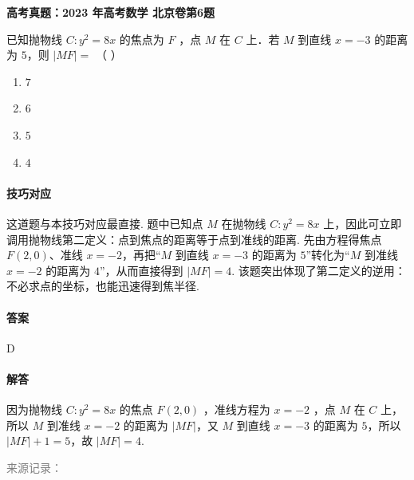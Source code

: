 \documentclass[UTF8,a4paper,11pt]{ctexart}
\newenvironment{gaokao}[1]{\par\medskip\noindent\textbf{高考真题：#1}\par\smallskip}{\par\medskip}
\begin{document}
\begin{gaokao}{2023 年高考数学 北京卷第6题}

已知抛物线 $C: y^2 = 8x$ 的焦点为 $F$ ，点 $M$ 在 $C$ 上．若 $M$ 到直线 $x = -3$ 的距离为 $5$，则 $|MF| =$ （ ）

\begin{enumerate}[label=\Alph*. ,itemsep=2pt]

\item $7$

\item $6$

\item $5$

\item $4$

\end{enumerate}

\begin{center}


\end{center}

\paragraph{技巧对应}

这道题与本技巧对应最直接. 题中已知点 $M$ 在抛物线 $C:y^2=8x$ 上，因此可立即调用抛物线第二定义：点到焦点的距离等于点到准线的距离. 先由方程得焦点 $F(2,0)$、准线 $x=-2$，再把“$M$ 到直线 $x=-3$ 的距离为 $5$”转化为“$M$ 到准线 $x=-2$ 的距离为 $4$”，从而直接得到 $|MF|=4$. 该题突出体现了第二定义的逆用：不必求点的坐标，也能迅速得到焦半径.

\paragraph{答案}

D

\paragraph{解答}

因为抛物线 $C: y^2 = 8x$ 的焦点 $F(2,0)$ ，准线方程为 $x = -2$ ，点 $M$ 在 $C$ 上，所以 $M$ 到准线 $x = -2$ 的距离为 $|MF|$，又 $M$ 到直线 $x = -3$ 的距离为 $5$，所以 $|MF| + 1 = 5$，故 $|MF| = 4$.

\par\smallskip\textcolor{gray}{\footnotesize 来源记录：\texttt{}}

\end{gaokao}
\end{document}
